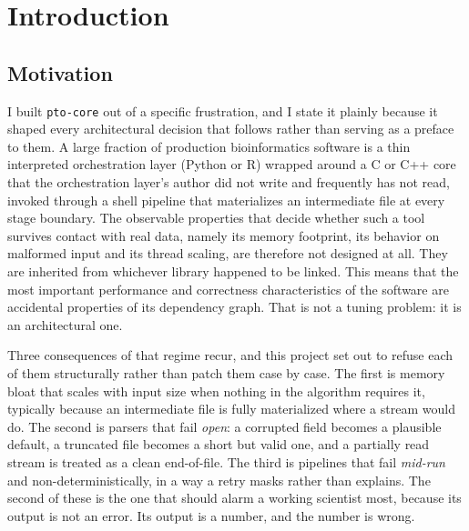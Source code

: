 \documentclass[10pt,twocolumn]{article}
\begin{document}
\section{Introduction}

\subsection{Motivation}

I built \texttt{pto-core} out of a specific frustration, and I state it
plainly because it shaped every architectural decision that follows rather
than serving as a preface to them. A large fraction of production
bioinformatics software is a thin interpreted orchestration layer (Python or
R) wrapped around a C or C++ core that the orchestration layer's author did
not write and frequently has not read, invoked through a shell pipeline that
materializes an intermediate file at every stage boundary. The observable
properties that decide whether such a tool survives contact with real data,
namely its memory footprint, its behavior on malformed input and its thread
scaling, are therefore not designed at all. They are inherited from whichever
library happened to be linked. This means that the most important performance
and correctness characteristics of the software are accidental properties of
its dependency graph. That is not a tuning problem: it is an architectural
one.

Three consequences of that regime recur, and this project set out to refuse
each of them structurally rather than patch them case by case. The first is
memory bloat that scales with input size when nothing in the algorithm
requires it, typically because an intermediate file is fully materialized
where a stream would do. The second is parsers that fail \emph{open}:
a corrupted field becomes a plausible default, a truncated file becomes a
short but valid one, and a partially read stream is treated as a clean
end-of-file. The third is pipelines that fail \emph{mid-run} and
non-deterministically, in a way a retry masks rather than explains. The
second of these is the one that should alarm a working scientist most,
because its output is not an error. Its output is a number, and the number is
wrong.
\end{document}
